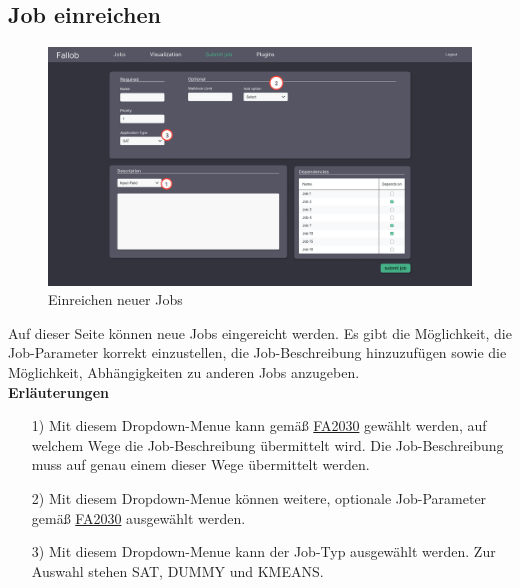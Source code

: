 \subsection{Job einreichen}
\label{pages:submit-job}
\begin{figure}[H]
    \centering
    \includegraphics[width=\textwidth]{images-interface/v4_interface/submit_job_page_4.pdf}
    \caption{Einreichen neuer Jobs}
    \label{fig:submit-job}
\end{figure}
Auf dieser Seite können neue Jobs eingereicht werden. Es gibt die Möglichkeit, die Job-Parameter korrekt einzustellen, die Job-Beschreibung hinzuzufügen sowie die Möglichkeit, Abhängigkeiten zu anderen Jobs anzugeben. \\

\textbf{Erläuterungen}
\begin{itemize}
    \item[1)] Mit diesem \gls{Dropdown-Menue} kann gemäß \hyperref[FA:Web-Interface:Job einreichen]{FA2030} gewählt werden, auf welchem Wege die Job-Beschreibung übermittelt wird. Die Job-Beschreibung muss auf genau einem dieser Wege übermittelt werden.
    \item[2)] Mit diesem \gls{Dropdown-Menue} können weitere, optionale Job-Parameter gemäß \hyperref[FA:Web-Interface:Job einreichen]{FA2030} ausgewählt werden. 
    \item[3)] Mit diesem \gls{Dropdown-Menue} kann der Job-Typ ausgewählt werden. Zur Auswahl stehen SAT, DUMMY und KMEANS.
\end{itemize}

\newpage
